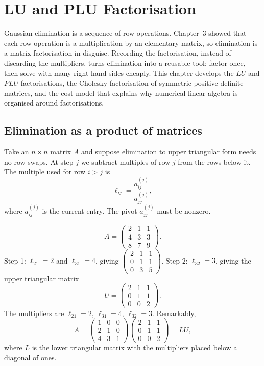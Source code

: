 \chapter{LU and PLU Factorisation}

Gaussian elimination is a sequence of row operations. Chapter~3 showed that each row operation is a multiplication by an elementary matrix, so elimination is a matrix factorisation in disguise. Recording the factorisation, instead of discarding the multipliers, turns elimination into a reusable tool: factor once, then solve with many right-hand sides cheaply. This chapter develops the $LU$ and $PLU$ factorisations, the Cholesky factorisation of symmetric positive definite matrices, and the cost model that explains why numerical linear algebra is organised around factorisations.

\section{Elimination as a product of matrices}

Take an $n\times n$ matrix $A$ and suppose elimination to upper triangular form needs no row swaps. At step $j$ we subtract multiples of row $j$ from the rows below it. The multiple used for row $i>j$ is
\[ \ell_{ij}=\frac{a^{(j)}_{ij}}{a^{(j)}_{jj}}, \]
where $a^{(j)}_{ij}$ is the current entry. The pivot $a^{(j)}_{jj}$ must be nonzero.

\begin{example}
\[
A=\begin{pmatrix}2&1&1\\4&3&3\\8&7&9\end{pmatrix}.
\]
Step 1: $\ell_{21}=2$ and $\ell_{31}=4$, giving
$\begin{pmatrix}2&1&1\\0&1&1\\0&3&5\end{pmatrix}$. Step 2: $\ell_{32}=3$, giving the upper triangular matrix
\[ U=\begin{pmatrix}2&1&1\\0&1&1\\0&0&2\end{pmatrix}. \]
The multipliers are $\ell_{21}=2,\ \ell_{31}=4,\ \ell_{32}=3$. Remarkably,
\[ A=\begin{pmatrix}1&0&0\\2&1&0\\4&3&1\end{pmatrix}\begin{pmatrix}2&1&1\\0&1&1\\0&0&2\end{pmatrix}=LU, \]
where $L$ is the lower triangular matrix with the multipliers placed below a diagonal of ones.
\end{example}

